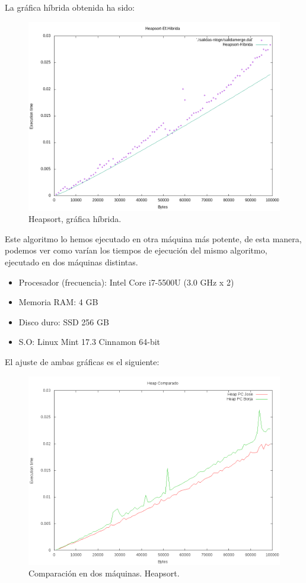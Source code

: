 La gráfica híbrida obtenida ha sido:
\begin{figure}[H]
	\centering
	\includegraphics[scale=0.5]{imagenes/heapsort-hibrida.png}
	\caption{Heapsort, gráfica híbrida.}
	\label{fig:E12}
\end{figure}
Este algoritmo lo hemos ejecutado en otra máquina más potente, de esta manera, podemos ver como varían los tiempos de ejecución del mismo algoritmo, ejecutado en dos máquinas distintas.
\begin{itemize}
	\item Procesador (frecuencia): Intel Core i7-5500U (3.0 GHz x 2)
	\item Memoria RAM: 4 GB
	\item Disco duro: SSD 256 GB
	\item S.O: Linux Mint 17.3 Cinnamon 64-bit
\end{itemize}
El ajuste de ambas gráficas es el siguiente:
\begin{figure}[htb]
	\centering
	\includegraphics[scale=0.5]{imagenes/HeapComparado.png}
	\caption{Comparación en dos máquinas. Heapsort.}
	\label{fig:E13}
\end{figure}


